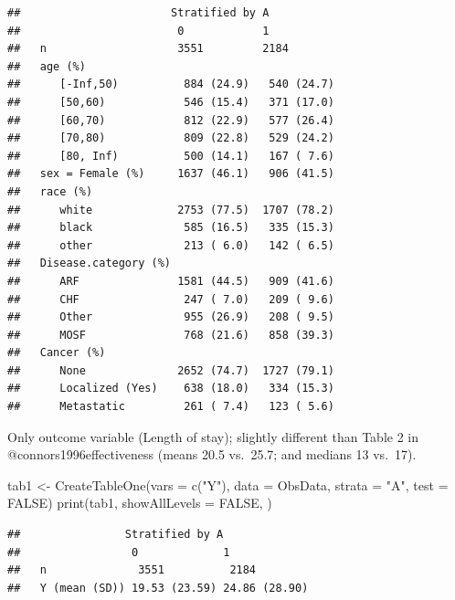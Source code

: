 \documentclass[
]{book}
\newenvironment{Shaded}{\begin{snugshade}}{\end{snugshade}}
\newcommand{\AttributeTok}[1]{\textcolor[rgb]{0.77,0.63,0.00}{#1}}
\newcommand{\ConstantTok}[1]{\textcolor[rgb]{0.00,0.00,0.00}{#1}}
\newcommand{\FunctionTok}[1]{\textcolor[rgb]{0.00,0.00,0.00}{#1}}
\newcommand{\NormalTok}[1]{#1}
\newcommand{\OtherTok}[1]{\textcolor[rgb]{0.56,0.35,0.01}{#1}}
\newcommand{\StringTok}[1]{\textcolor[rgb]{0.31,0.60,0.02}{#1}}
\begin{document}
\begin{verbatim}
##                       Stratified by A
##                        0            1           
##   n                    3551         2184        
##   age (%)                                       
##      [-Inf,50)          884 (24.9)   540 (24.7) 
##      [50,60)            546 (15.4)   371 (17.0) 
##      [60,70)            812 (22.9)   577 (26.4) 
##      [70,80)            809 (22.8)   529 (24.2) 
##      [80, Inf)          500 (14.1)   167 ( 7.6) 
##   sex = Female (%)     1637 (46.1)   906 (41.5) 
##   race (%)                                      
##      white             2753 (77.5)  1707 (78.2) 
##      black              585 (16.5)   335 (15.3) 
##      other              213 ( 6.0)   142 ( 6.5) 
##   Disease.category (%)                          
##      ARF               1581 (44.5)   909 (41.6) 
##      CHF                247 ( 7.0)   209 ( 9.6) 
##      Other              955 (26.9)   208 ( 9.5) 
##      MOSF               768 (21.6)   858 (39.3) 
##   Cancer (%)                                    
##      None              2652 (74.7)  1727 (79.1) 
##      Localized (Yes)    638 (18.0)   334 (15.3) 
##      Metastatic         261 ( 7.4)   123 ( 5.6)
\end{verbatim}

\begin{rmdcomment}
Only outcome variable (Length of stay); slightly different than Table 2
in @connors1996effectiveness (means 20.5 vs.~25.7; and medians 13
vs.~17).
\end{rmdcomment}

\begin{Shaded}
\begin{Highlighting}[]
\NormalTok{tab1 }\OtherTok{\textless{}{-}} \FunctionTok{CreateTableOne}\NormalTok{(}\AttributeTok{vars =} \FunctionTok{c}\NormalTok{(}\StringTok{"Y"}\NormalTok{),}
                       \AttributeTok{data =}\NormalTok{ ObsData, }
                       \AttributeTok{strata =} \StringTok{"A"}\NormalTok{, }
                       \AttributeTok{test =} \ConstantTok{FALSE}\NormalTok{)}
\FunctionTok{print}\NormalTok{(tab1, }\AttributeTok{showAllLevels =} \ConstantTok{FALSE}\NormalTok{, )}
\end{Highlighting}
\end{Shaded}

\begin{verbatim}
##                Stratified by A
##                 0             1            
##   n              3551          2184        
##   Y (mean (SD)) 19.53 (23.59) 24.86 (28.90)
\end{verbatim}
\end{document}
